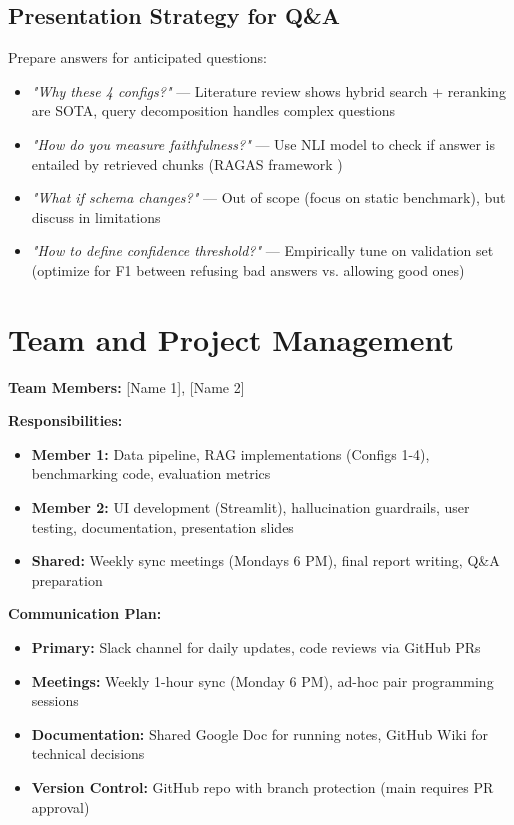 \documentclass[11pt,a4paper]{article}
\begin{document}
\subsection{Presentation Strategy for Q\&A}
Prepare answers for anticipated questions:
\begin{itemize}[leftmargin=*,nosep]
    \item \textit{"Why these 4 configs?"} — Literature review shows hybrid search + reranking are SOTA, query decomposition handles complex questions \cite{gao2023retrieval}
    \item \textit{"How do you measure faithfulness?"} — Use NLI model to check if answer is entailed by retrieved chunks (RAGAS framework \cite{ragas2024})
    \item \textit{"What if schema changes?"} — Out of scope (focus on static benchmark), but discuss in limitations
    \item \textit{"How to define confidence threshold?"} — Empirically tune on validation set (optimize for F1 between refusing bad answers vs. allowing good ones)
\end{itemize}

\section{Team and Project Management}

\textbf{Team Members:} [Name 1], [Name 2]

\textbf{Responsibilities:}
\begin{itemize}[leftmargin=*,nosep]
    \item \textbf{Member 1:} Data pipeline, RAG implementations (Configs 1-4), benchmarking code, evaluation metrics
    \item \textbf{Member 2:} UI development (Streamlit), hallucination guardrails, user testing, documentation, presentation slides
    \item \textbf{Shared:} Weekly sync meetings (Mondays 6 PM), final report writing, Q\&A preparation
\end{itemize}

\textbf{Communication Plan:}
\begin{itemize}[leftmargin=*,nosep]
    \item \textbf{Primary:} Slack channel for daily updates, code reviews via GitHub PRs
    \item \textbf{Meetings:} Weekly 1-hour sync (Monday 6 PM), ad-hoc pair programming sessions
    \item \textbf{Documentation:} Shared Google Doc for running notes, GitHub Wiki for technical decisions
    \item \textbf{Version Control:} GitHub repo with branch protection (main requires PR approval)
\end{itemize}
\end{document}
